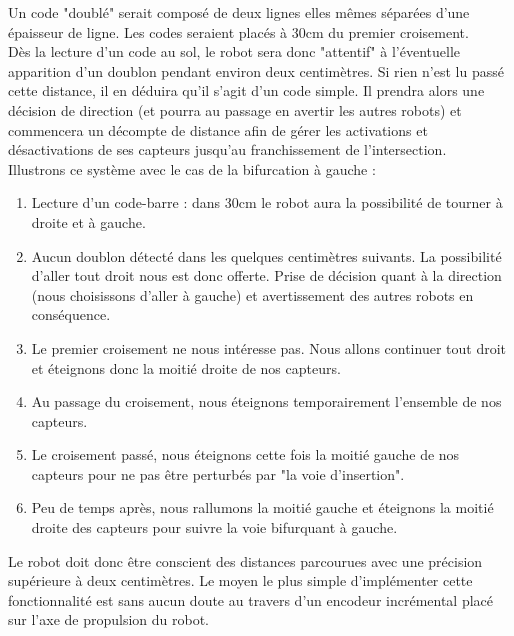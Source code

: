 		Un code "doublé" serait composé de deux lignes elles mêmes séparées d'une épaisseur de ligne.
		Les codes seraient placés à 30cm du premier croisement.\\

		Dès la lecture d'un code au sol, le robot sera donc "attentif" à l'éventuelle apparition d'un doublon pendant environ deux centimètres. Si rien n'est lu passé cette distance, il en déduira qu'il s'agit d'un code simple. Il prendra alors une décision de direction (et pourra au passage en avertir les autres robots) et commencera un décompte de distance afin de gérer les activations et désactivations de ses capteurs jusqu'au franchissement de l'intersection.\\


		Illustrons ce système avec le cas de la bifurcation à gauche :


		\begin{enumerate}
			\item Lecture d'un code-barre : dans 30cm le robot aura la possibilité de tourner à droite et à gauche.
			\item Aucun doublon détecté dans les quelques centimètres suivants. La possibilité d'aller tout droit nous est donc offerte. Prise de décision quant à la direction (nous choisissons d'aller à gauche) et avertissement des autres robots en conséquence.
			\item Le premier croisement ne nous intéresse pas. Nous allons continuer tout droit et éteignons donc la moitié droite de nos capteurs.
			\item Au passage du croisement, nous éteignons temporairement l'ensemble de nos capteurs.
			\item Le croisement passé, nous éteignons cette fois la moitié gauche de nos capteurs pour ne pas être perturbés par "la voie d'insertion".
			\item Peu de temps après, nous rallumons la moitié gauche et éteignons la moitié droite des capteurs pour suivre la voie bifurquant à gauche.
		\end{enumerate}

		Le robot doit donc être conscient des distances parcourues avec une précision supérieure à deux centimètres. Le moyen le plus simple d'implémenter cette fonctionnalité est sans aucun doute au travers d'un encodeur incrémental placé sur l'axe de propulsion du robot.\\

